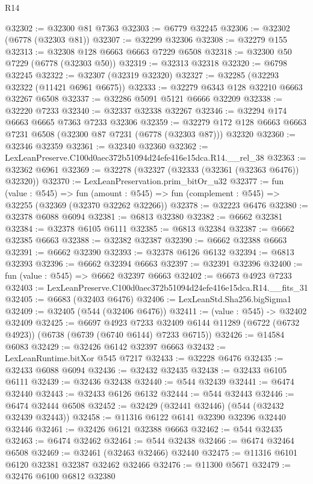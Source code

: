 \begin{lexlean}{R14}
\begin{coremodule}
@32302 := @32300 @81 @7363
@32303 := @6779 @32245
@32306 := @32302 (@6778 (@32303 @81))
@32307 := @32299 @32306
@32308 := @32279 @155
@32313 := @32308 @128 @6663 @6663 @7229 @6508
@32318 := @32300 @50 @7229 (@6778 (@32303 @50))
@32319 := @32313 @32318
@32320 := @6798 @32245
@32322 := @32307 (@32319 @32320)
@32327 := @32285 (@32293 @32322 (@11421 @6961 @6675))
@32333 := @32279 @6343 @128 @32210 @6663 @32267 @6508
@32337 := @32286 @5091 @5121 @6666 @32209
@32338 := @32220 @7233
@32340 := @32337 @32338 @32267
@32346 := @32294 @174 @6663 @6665 @7363 @7233 @32306
@32359 := @32279 @172 @128 @6663 @6663 @7231 @6508 (@32300 @87 @7231 (@6778 (@32303 @87))) @32320
@32360 := @32346 @32359
@32361 := @32340 @32360
@32362 := LexLeanPreserve.C100d0aec372b51094d24efe416e15dca.R14.__rel_38
@32363 := @32362 @6961
@32369 := @32278 (@32327 (@32333 (@32361 (@32363 @6476)) @32320))
@32370 := LexLeanPreservation.prim_bitOr_u32
@32377 := fun (value : @545) =>
  fun (amount : @545) => fun (complement : @545) => @32255 (@32369 (@32370 @32262 @32266))
@32378 := @32223 @6476
@32380 := @32378 @6088 @6094
@32381 := @6813 @32380
@32382 := @6662 @32381
@32384 := @32378 @6105 @6111
@32385 := @6813 @32384
@32387 := @6662 @32385 @6663
@32388 := @32382 @32387
@32390 := @6662 @32388 @6663
@32391 := @6662 @32390
@32393 := @32378 @6126 @6132
@32394 := @6813 @32393
@32396 := @6662 @32394 @6663
@32397 := @32391 @32396
@32400 := fun (value : @545) => @6662 @32397 @6663
@32402 := @6673 @4923 @7233
@32403 := LexLeanPreserve.C100d0aec372b51094d24efe416e15dca.R14.__fits_31
@32405 := @6683 (@32403 @6476)
@32406 := LexLeanStd.Sha256.bigSigma1
@32409 := @32405 (@544 (@32406 @6476))
@32411 := (value : @545) -> @32402 @32409
@32425 := @6697
    @4923
    @7233
    @32409
    @6144
    @11289
    (@6722 (@6732 @4923))
    (@6738 (@6739 (@6740 @6144) @7233 @6715))
@32426 := @14584 @6083
@32429 := @32426 @6142 @32397 @6663
@32432 := LexLeanRuntime.bitXor @545 @7217
@32433 := @32228 @6476
@32435 := @32433 @6088 @6094
@32436 := @32432 @32435
@32438 := @32433 @6105 @6111
@32439 := @32436 @32438
@32440 := @544 @32439
@32441 := @6474 @32440
@32443 := @32433 @6126 @6132
@32444 := @544 @32443
@32446 := @6474 @32444 @6508
@32452 := @32429 (@32441 @32446) (@544 (@32432 @32439 @32443))
@32458 := @11316 @6122 @6141 @32390 @32396 @32440 @32446
@32461 := @32426 @6121 @32388 @6663
@32462 := @544 @32435
@32463 := @6474 @32462
@32464 := @544 @32438
@32466 := @6474 @32464 @6508
@32469 := @32461 (@32463 @32466) @32440
@32475 := @11316 @6101 @6120 @32381 @32387 @32462 @32466
@32476 := @11300 @5671
@32479 := @32476 @6100 @6812 @32380

\end{coremodule}
\end{lexlean}
